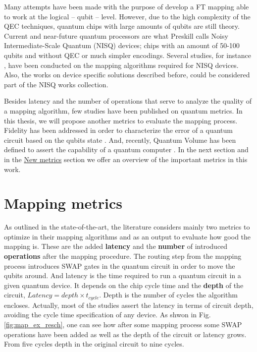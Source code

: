 Many attempts have been made \cite{Dousti_2014,Heckey_2015,hwang18:hierar_system_mappin_large_scale,murphy18:contr,Lao_2018} with the purpose of develop a FT mapping able to work at the logical -- qubit -- level.
However, due to the high complexity of the QEC techniques, quantum chips with large amounts of qubits are still theory.
Current and near-future quantum processors are what Preskill \cite{Preskill_2018} calls Noisy Intermediate-Scale Quantum (NISQ) devices; chips with an amount of 50-100 qubits and without QEC or much simpler encodings.
Several studies, for instance \cite{tannu18:case_variab_aware_polic_nisq,paler18:nisq,paler18:influen_initial_qubit_placem_durin}, have been conducted on the mapping algorithms required for NISQ devices.
Also, the works on device specific solutions \cite{zulehner17:effic_method_mappin_quant_circuit,Siraichi_2018,mckay18:qiskit_backen_specif_openq_openp_exper,Dueck_2018,Venturelli_2018} described before, could be considered part of the NISQ works collection.

Besides latency and the number of operations that serve to analyze the quality of a mapping algorithm, few studies have been published on quantum metrics.
In this thesis, we will propose another metrics to evaluate the mapping process.
Fidelity has been addressed in order to characterize the error of a quantum circuit based on the qubits state \cite{Jozsa_1994,Nielsen_2009}.
And, recently, Quantum Volume has been defined to assert the capability of a quantum computer \cite{Moll_2018}.
In the next section and in the \href{chapter-3.org}{New metrics} section we offer an overview of the important metrics in this work.

\section{Mapping metrics}
\label{sec:orgc729465}
As outlined in the state-of-the-art, the literature considers mainly two metrics to optimize in their mapping algorithms and as an output to evaluate how good the mapping is.
These are the added \textbf{latency} and the \textbf{number} of introduced \textbf{operations} after the mapping procedure.
The routing step from the mapping process introduces SWAP gates in the quantum circuit in order to move the qubits around.
And latency is the time required to run a quantum circuit in a given quantum device.
It depends on the chip cycle time and the \textbf{depth} of the circuit, \(Latency = depth \times t_{cycle}\).
Depth is the number of cycles the algorithm encloses.
Actually, most of the studies \cite{Metodi_2006,Whitney_2007,Bahreini_2015} assert the latency in terms of circuit depth, avoiding the cycle time specification of any device.
As shwon in Fig. \ref{fig:map_ex_resch}, one can see how after some mapping process some SWAP operations have been added as well as the depth of the circuit or latency grows.
From five cycles depth in the original circuit to nine cycles.


